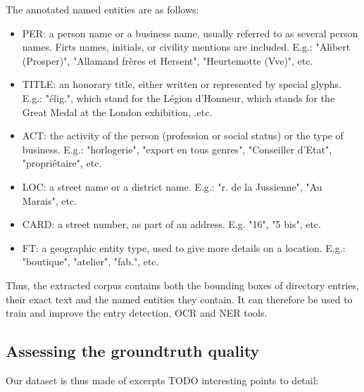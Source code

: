 The annotated named entities are as follows:
\begin{itemize}
    \item PER: a person name or a business name, usually referred to as several person names. Firts names, initials, or civility mentions are included. E.g.: "Alibert (Prosper)", "Allamand frères et Hersent", "Heurtemotte (Vve)", etc.
    \item TITLE: an honorary title, either written or represented by special glyphs. E.g.: "élig.",  which stand for the Légion d'Honneur,  which stands for the Great Medal at the London exhibition, .etc.
    \item ACT: the activity of the person (profession or social status) or the type of business. E.g.: "horlogerie", "export en tous genres", "Conseiller d'Etat", "propriétaire", etc.
    \item LOC: a street name or a district name. E.g.: "r. de la Jussienne", "Au Marais", etc.
    \item CARD: a street number, as part of an address. E.g. "16", "5 bis", etc.
    \item FT: a geographic entity type, used to give more details on a location. E.g.: "boutique", "atelier", "fab.", etc.
\end{itemize}

Thus, the extracted corpus contains both the bounding boxes of directory entries, their exact text and the named entities they contain. It can therefore be used to train and improve the entry detection, OCR and NER tools.

\subsection{Assessing the groundtruth quality}
Our dataset is thus made of excerpts TODO interesting points to detail:

